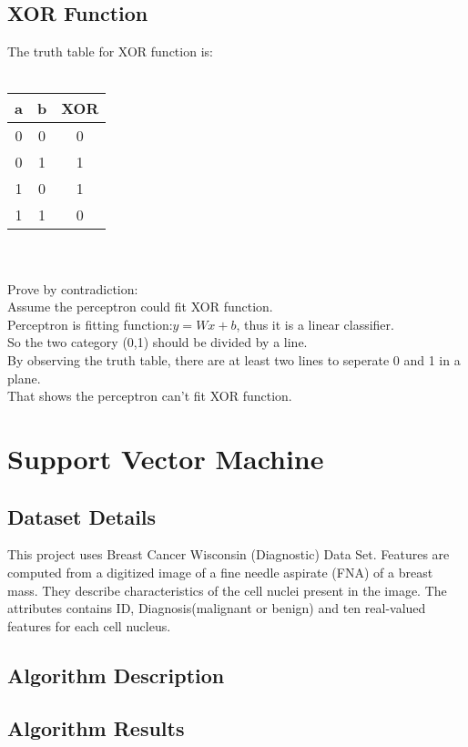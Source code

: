 \documentclass{article}
\begin{document}
\subsection{XOR Function}
The truth table for XOR function is:\\
\\
\begin{tabular}{|c|c|c|}
\hline
a&b&XOR\\
\hline
0&0&0\\
0&1&1\\
1&0&1\\
1&1&0\\
\hline
\end{tabular}\\
\\
Prove by contradiction:\\
Assume the perceptron could fit XOR function. \\Perceptron is fitting function:$y=Wx+b$, thus it is a linear classifier.\\
So the two category (0,1) should be divided by a line.\\
By observing the truth table, there are at least two lines to seperate 0 and 1 in a plane.\\
That shows the perceptron can't fit XOR function.

\section{Support Vector Machine}
\subsection{Dataset Details}
This project uses Breast Cancer Wisconsin (Diagnostic) Data Set. Features are computed from a digitized image of a fine needle aspirate (FNA) of a breast mass. They describe characteristics of the cell nuclei present in the image. 
The attributes contains ID, Diagnosis(malignant or benign) and ten real-valued features for each cell nucleus.
\subsection{Algorithm Description}
\subsection{Algorithm Results}
\end{document}
